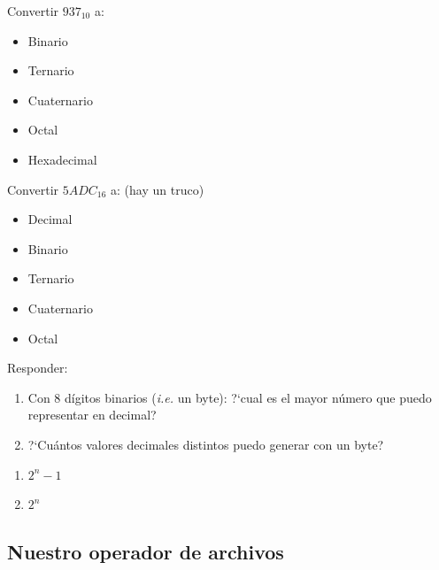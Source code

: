 \begin{frame}
    \begin{ejercicio}{}
        Convertir $937_{10}$ a:
        \begin{itemize}
            \item Binario
            \item Ternario
            \item Cuaternario
            \item Octal
            \item Hexadecimal
        \end{itemize}
    \end{ejercicio}
    \pause
    \begin{ejercicio}{}
        Convertir $5ADC_{16}$ a: (hay un truco)
        \begin{itemize}
            \item Decimal
            \item Binario
            \item Ternario
            \item Cuaternario
            \item Octal
        \end{itemize}
    \end{ejercicio}
\end{frame}


\begin{frame}
    \begin{ejercicio}{}
        Responder:
        \begin{enumerate}
            \item Con 8 d\'igitos binarios (\emph{i.e.} un byte):  ?`cual es el mayor n\'umero que puedo representar en decimal?
            \item ?`Cu\'antos valores decimales distintos puedo generar con un byte?
        \end{enumerate}
    \end{ejercicio}

    \pause
    \begin{enumerate}
        \item $2^n - 1$
        \item $2^n$
    \end{enumerate}

\end{frame}

\subsection{Nuestro operador de archivos}

